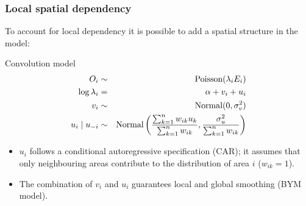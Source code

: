 \documentclass[slidestop,compress,serif,10pt]{beamer}
\begin{document}
\begin{frame}\frametitle{Local spatial dependency}
To account for local dependency it is possible to add a spatial structure in the model:
\begin{block}{Convolution model}
\vspace{-0.5cm}
\begin{eqnarray*}
O_i & \sim & \hbox{Poisson}(\lambda_i E_i) \\
\log \lambda_i & = & \alpha + v_i + u_i\\
v_i & \sim  & \hbox{Normal}(0, \sigma_v^2)\\
u_i \mid u_{-i} & \sim & \hbox{Normal}\left(\frac{\sum_{k=1}^n w_{ik} u_k}{\sum_{k=1}^n w_{ik}}, \frac{\sigma^2_u}{\sum_{k=1}^n w_{ik}}\right)\end{eqnarray*}
\end{block}
\begin{itemize}
  \item $u_i$ follows a conditional autoregressive specification (CAR); it assumes that only neighbouring areas contribute to the distribution of area $i$ ($w_{ik}=1$).
  \item The combination of $v_i$ and $u_i$ guarantees local and global smoothing (BYM model).
\end{itemize}

\end{frame}
\end{document}
